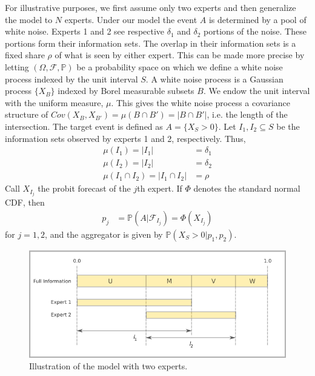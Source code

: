 \documentclass[11pt,twoside]{article}
\renewcommand{\P}{\mathbb{P}}
\begin{document}
For illustrative purposes, we first assume only two experts and then generalize the model to $N$ experts. Under our model the event $A$ is determined by a pool of white noise. Experts 1 and 2 see respective $\delta_1$ and $\delta_2$ portions of the noise. These portions form their information sets. The overlap in their information sets is a fixed share $\rho$ of what is seen by either expert. This can be made more precise by letting  $(\Omega, \mathcal{F}, \P)$ be a probability space on which we define a white noise process indexed by the unit interval $S$. A white noise process is a Gaussian process $\{ X_B \}$ indexed by Borel measurable subsets $B$. We endow the unit interval with the uniform measure, $\mu$. This gives the white noise process a covariance structure of $Cov(X_B, X_{B'}) = \mu(B \cap B') = |B \cap B'|$, i.e. the length of the intersection. The target event is defined as $A = \{ X_{S} > 0\}$. Let $I_1, I_2 \subseteq S$ be the information sets observed by experts 1 and 2, respectively. Thus,
\begin{align*}
\mu(I_1) = |I_1| &= \delta_1\\
\mu(I_2) = |I_2| &= \delta_2\\
\mu(I_1 \cap I_2) =  |I_1 \cap I_2| &= \rho
\end{align*}
Call $X_{I_j}$ the probit forecast of the $j$th expert.  If $\Phi$ denotes the standard normal CDF, then
\begin{align*}
p_j &= \P(A | \mathcal{F}_{I_j}) = \Phi(X_{I_j})
\end{align*}
for $j = 1, 2$, and the aggregator is given by $\P(X_{S} > 0 | p_1, p_2)$.

\begin{figure}[htbp]
   \includegraphics[width = \textwidth]{N=2} %
   \caption{Illustration of the model with two experts.}
   \label{diagram2}
\end{figure}
\end{document}
